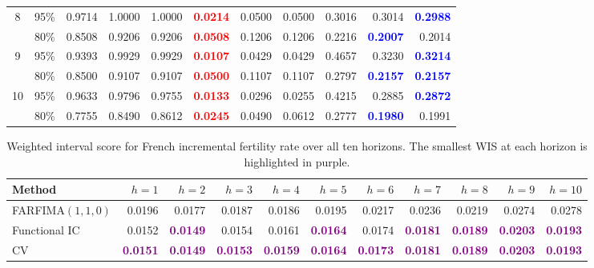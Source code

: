 \begin{longtable}[c]{ccrrrrrrrrr}
\cmidrule(lr){1-11}
8 & 95\% & 0.9714 & 1.0000 & 1.0000 & \textcolor{red}{\textbf{0.0214}} & 0.0500 & 0.0500 & 0.3016 & 0.3014 & \textcolor{blue}{\textbf{0.2988}} \\
 & 80\% & 0.8508 & 0.9206 & 0.9206 & \textcolor{red}{\textbf{0.0508}} & 0.1206 & 0.1206 & 0.2216 & \textcolor{blue}{\textbf{0.2007}} & 0.2014 \\
\cmidrule(lr){1-11}
9 & 95\% & 0.9393 & 0.9929 & 0.9929 & \textcolor{red}{\textbf{0.0107}} & 0.0429 & 0.0429 & 0.4657 & 0.3230 & \textcolor{blue}{\textbf{0.3214}} \\
 & 80\% & 0.8500 & 0.9107 & 0.9107 & \textcolor{red}{\textbf{0.0500}} & 0.1107 & 0.1107 & 0.2797 & \textcolor{blue}{\textbf{0.2157}} & \textcolor{blue}{\textbf{0.2157}} \\
\cmidrule(lr){1-11}
10 & 95\% & 0.9633 & 0.9796 & 0.9755 & \textcolor{red}{\textbf{0.0133}} & 0.0296 & 0.0255 & 0.4215 & 0.2885 & \textcolor{blue}{\textbf{0.2872}} \\
 & 80\% & 0.7755 & 0.8490 & 0.8612 & \textcolor{red}{\textbf{0.0245}} & 0.0490 & 0.0612 & 0.2777 & \textcolor{blue}{\textbf{0.1980}} & 0.1991 \\
\end{longtable}
\endgroup
\endgroup

\begin{table}[!htb]
\centering
\begingroup\fontsize{7}{9}\selectfont
\setlength{\tabcolsep}{2.5pt}
\caption{Weighted interval score for French incremental fertility rate over all ten horizons. The smallest WIS at each horizon is highlighted in purple.}
\label{tab:emp-fertility-wis}
\begin{tabular}{lrrrrrrrrrr}
\toprule
Method & $h=1$ & $h=2$ & $h=3$ & $h=4$ & $h=5$ & $h=6$ & $h=7$ & $h=8$ & $h=9$ & $h=10$ \\
\midrule
FARFIMA$(1,1,0)$ & 0.0196 & 0.0177 & 0.0187 & 0.0186 & 0.0195 & 0.0217 & 0.0236 & 0.0219 & 0.0274 & 0.0278 \\
Functional IC & 0.0152 & \textcolor{purple}{\textbf{0.0149}} & 0.0154 & 0.0161 & \textcolor{purple}{\textbf{0.0164}} & 0.0174 & \textcolor{purple}{\textbf{0.0181}} & \textcolor{purple}{\textbf{0.0189}} & \textcolor{purple}{\textbf{0.0203}} & \textcolor{purple}{\textbf{0.0193}} \\
CV & \textcolor{purple}{\textbf{0.0151}} & \textcolor{purple}{\textbf{0.0149}} & \textcolor{purple}{\textbf{0.0153}} & \textcolor{purple}{\textbf{0.0159}} & \textcolor{purple}{\textbf{0.0164}} & \textcolor{purple}{\textbf{0.0173}} & \textcolor{purple}{\textbf{0.0181}} & \textcolor{purple}{\textbf{0.0189}} & \textcolor{purple}{\textbf{0.0203}} & \textcolor{purple}{\textbf{0.0193}} \\
\bottomrule
\end{tabular}
\endgroup
\end{table}

